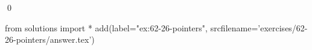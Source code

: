 
\begin{ex}
  \label{ex:62-26-pointers}
  
  \qed
\end{ex}
\begin{python0}
from solutions import *
add(label="ex:62-26-pointers",
    srcfilename='exercises/62-26-pointers/answer.tex')
\end{python0}
